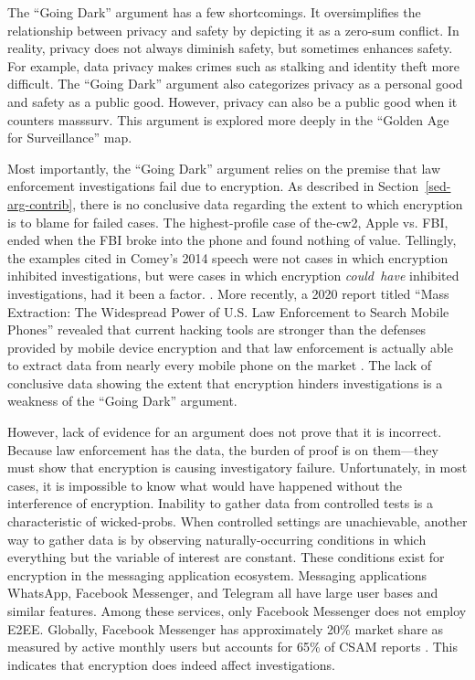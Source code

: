 \documentclass{IEEEtran}
\def\ii#1{\mbox{\textit{#1}}}
\newcommand{\mysec}[1]{Section~\ref{#1}}
\begin{document}
The ``Going Dark'' argument has a few shortcomings. It oversimplifies the relationship between privacy and safety by
depicting it as a zero-sum conflict. In reality, privacy does not always diminish safety, but sometimes enhances safety.
For example, data privacy makes crimes such as stalking and identity theft more difficult. The ``Going Dark'' argument
also categorizes privacy as a personal good and safety as a public good. However, privacy can also be a public good when
it counters \ac{masssurv}. This argument is explored more deeply in the ``Golden Age for Surveillance'' map.

Most importantly, the ``Going Dark'' argument relies on the premise that law enforcement investigations fail due to
encryption. As described in \mysec{sed-arg-contrib}, there is no conclusive data regarding the extent to which
encryption is to blame for failed cases. The highest-profile case of \ac{the-cw2}, Apple vs. FBI, ended when the
\ac{FBI} broke into the phone and found nothing of value. Tellingly, the examples cited in Comey's 2014 speech were not
cases in which encryption inhibited investigations, but were cases in which encryption \ii{could have} inhibited
investigations, had it been a factor. \cite{comey_2014}. More recently, a 2020 report titled ``Mass Extraction: The
Widespread Power of U.S. Law Enforcement to Search Mobile Phones'' revealed that current hacking tools are stronger than
the defenses provided by mobile device encryption and that law enforcement is actually able to extract data from nearly
every mobile phone on the market \cite{koepke_2020}. The lack of conclusive data showing the extent that encryption
hinders investigations is a weakness of the ``Going Dark'' argument.

However, lack of evidence for an argument does not prove that it is incorrect. Because law enforcement has the data, the
burden of proof is on them---they must show that encryption is causing investigatory failure. Unfortunately, in most
cases, it is impossible to know what would have happened without the interference of encryption. Inability to gather
data from controlled tests is a characteristic of \acp{wicked-prob}. When controlled settings are unachievable, another
way to gather data is by observing naturally-occurring conditions in which everything but the variable of interest are
constant. These conditions exist for encryption in the messaging application ecosystem. Messaging applications WhatsApp,
Facebook Messenger, and Telegram all have large user bases and similar features. Among these services, only Facebook
Messenger does not employ \ac{E2EE}. Globally, Facebook Messenger has approximately 20\% market share as measured by
active monthly users \cite{statista_2020} but accounts for 65\% of \ac{CSAM} reports \cite{keller_internet_2019}. This
indicates that encryption does indeed affect investigations.
\end{document}
